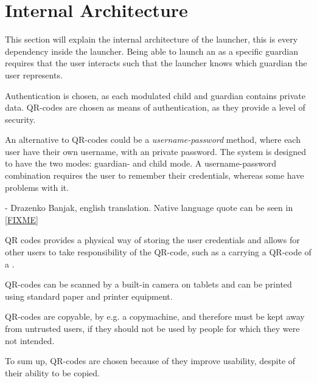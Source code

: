 \section{Internal Architecture}
This section will explain the internal architecture of the launcher, this is every dependency inside the launcher.
Being able to launch an \girafapp[] as a specific guardian requires that the user interacts such that the launcher knows which guardian the user represents.

Authentication is chosen, as each modulated child and guardian contains private data. QR-codes are chosen as means of authentication, as they provide a level of security.

An alternative to QR-codes could be a \emph{username-password} method, where each user have their own username, with an private password. The system is designed to have the two modes: guardian- and child mode. A username-password combination requires the user to remember their credentials, whereas some \autists[] have problems with it. 

 - Drazenko Banjak, english translation. Native language quote can be seen in \autoref{FIXME}

QR codes provides a physical way of storing the user credentials and allows for other users to take responsibility of the QR-code, such as a \guardian[] carrying a QR-code of a \autist[].

QR-codes can be scanned by a built-in camera on tablets and can be printed using standard paper and printer equipment. 

QR-codes are copyable, by e.g. a copymachine, and therefore must be kept away from untrusted users, if they should not be used by people for which they were not intended.

To sum up, QR-codes are chosen because of they improve usability, despite of their ability to be copied.


